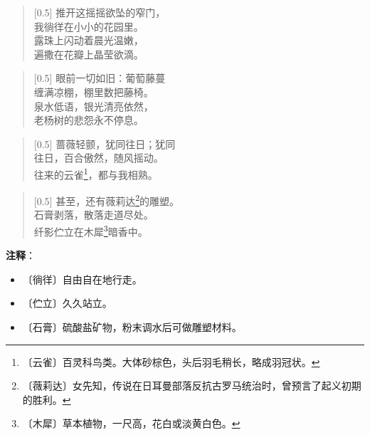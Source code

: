 \documentclass[12pt,UTF-8,openany]{ctexbook}
\begin{document}
\begin{large}
    
    \begin{verse}[0.5\linewidth]
        推开这摇摇欲坠的窄门， \\
        我徜徉在小小的花园里。 \\
        露珠上闪动着晨光温嫩， \\
        遍撒在花瓣上晶莹欲滴。
    \end{verse}
    
    
    \begin{verse}[0.5\linewidth]
        眼前一切如旧：葡萄藤蔓 \\
        缠满凉棚，棚里数把藤椅。 \\
        泉水低语，银光清亮依然， \\
        老杨树的悲怨永不停息。
    \end{verse}
    
    
    \begin{verse}[0.5\linewidth]
        蔷薇轻颤，犹同往日；犹同 \\
        往日，百合傲然，随风摇动。 \\
        往来的云雀\footnote{〔云雀〕百灵科鸟类。大体砂棕色，头后羽毛稍长，略成羽冠状。}，都与我相熟。
    \end{verse}
    
    
    \begin{verse}[0.5\linewidth]
        甚至，还有薇莉达\footnote{〔薇莉达〕女先知，传说在日耳曼部落反抗古罗马统治时，曾预言了起义初期的胜利。}的雕塑。 \\
        石膏剥落，散落走道尽处。 \\
        纤影伫立在木犀\footnote{〔木犀〕草本植物，一尺高，花白或淡黄白色。}暗香中。
    \end{verse}
    
\end{large}


\newpage

\textbf{注释}：

\vspace{-1em}

\begin{itemize}
    \setlength\itemsep{-0.2em}
    \item 〔徜徉〕自由自在地行走。
    \item 〔伫立〕久久站立。
    \item 〔石膏〕硫酸盐矿物，粉末调水后可做雕塑材料。
\end{itemize}
\end{document}
